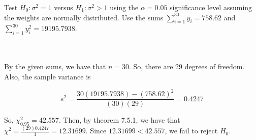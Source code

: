Test $H_0:\sigma^2=1$ versus $H_1:\sigma^2>1$ using the $\alpha=0.05$ significance level assuming the
weights are normally distributed. Use the sums $\sum_{i=1}^{30}y_i=758.62$ and
$\sum_{i=1}^{30}y_i^2=19195.7938$.\\\\

\begin{solution}\renewcommand{\qedsymbol}{}\ \\
    By the given sums, we have that $n=30$. So, there are 29 degrees of freedom. Also, the sample
    variance is
    
    $$s^2=\frac{30(19195.7938)-(758.62)^2}{(30)(29)}=0.4247$$
    
    So, $\chi^2_{0.95}=42.557$. Then, by theorem 7.5.1, we have that
    $\chi^2=\frac{(29)0.4247}{1}=12.31699$. Since $12.31699<42.557$, we fail to reject $H_0$.

\end{solution}